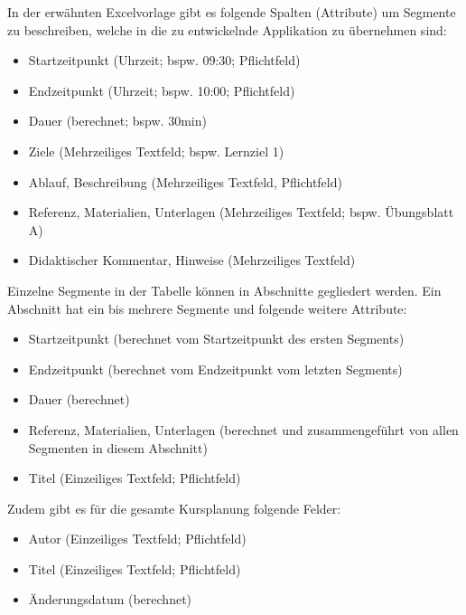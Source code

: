 In der erwähnten Excelvorlage gibt es folgende Spalten (Attribute) um Segmente zu beschreiben, welche in die zu entwickelnde Applikation zu übernehmen sind:
\begin{itemize}
  \item Startzeitpunkt (Uhrzeit; bspw. 09:30; Pflichtfeld)
  \item Endzeitpunkt (Uhrzeit; bspw. 10:00; Pflichtfeld)
  \item Dauer (berechnet; bspw. 30min)
  \item Ziele (Mehrzeiliges Textfeld; bspw. Lernziel 1)
  \item Ablauf, Beschreibung (Mehrzeiliges Textfeld, Pflichtfeld)
  \item Referenz, Materialien, Unterlagen (Mehrzeiliges Textfeld; bspw. Übungsblatt A)
  \item Didaktischer Kommentar, Hinweise (Mehrzeiliges Textfeld)
\end{itemize}

Einzelne Segmente in der Tabelle können in Abschnitte gegliedert werden. Ein Abschnitt hat ein bis mehrere Segmente und folgende weitere Attribute:
\begin{itemize}
  \item Startzeitpunkt (berechnet vom Startzeitpunkt des ersten Segments)
  \item Endzeitpunkt (berechnet vom Endzeitpunkt vom letzten Segments)
  \item Dauer (berechnet)
  \item Referenz, Materialien, Unterlagen (berechnet und zusammengeführt von allen Segmenten in diesem Abschnitt)
  \item Titel (Einzeiliges Textfeld; Pflichtfeld)
\end{itemize}

Zudem gibt es für die gesamte Kursplanung folgende Felder:
\begin{itemize}
  \item Autor (Einzeiliges Textfeld; Pflichtfeld)
  \item Titel (Einzeiliges Textfeld; Pflichtfeld)
  \item Änderungsdatum (berechnet)
\end{itemize}

